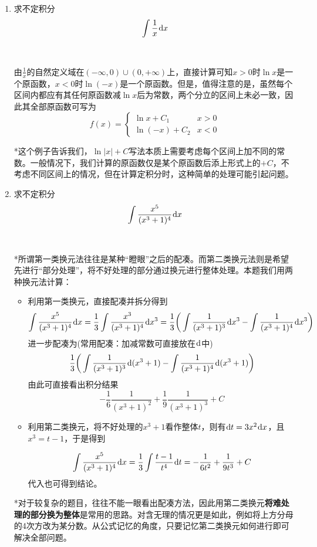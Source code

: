\documentclass[a4paper,UTF8,fontset=windows]{ctexart}
\newcommand*{\dr}{\hspace{0.07em}\mathrm{d}}
\begin{document}
\begin{enumerate}
    \item 求不定积分
    $$\int\frac{1}{x}\dr x$$
    
    \

    由$\frac{1}{x}$的自然定义域在$(-\infty,0)\cup(0,+\infty)$上，直接计算可知$x>0$时$\ln x$是一个原函数，$x<0$时$\ln(-x)$是一个原函数。但是，值得注意的是，虽然每个区间内都应有其任何原函数减$\ln x$后为常数，两个分立的区间上未必一致，因此其全部原函数可写为
    $$f(x)=\begin{cases}\ln x+C_1&x>0\\\ln(-x)+C_2&x<0\end{cases}$$

    *这个例子告诉我们，$\ln|x|+C$写法本质上需要考虑每个区间上加不同的常数。一般情况下，我们计算的原函数仅是某个原函数后添上形式上的$+C$，不考虑不同区间上的情况，但在计算定积分时，这种简单的处理可能引起问题。
    
    \item 求不定积分
    $$\int\frac{x^5}{(x^3+1)^4}\dr x$$

    \
    
    *所谓第一类换元法往往是某种``瞪眼''之后的配凑。而第二类换元法则是希望先进行``部分处理''，将不好处理的部分通过换元进行整体处理。本题我们用两种换元法计算：
    \begin{itemize}
        \item 利用第一类换元，直接配凑并拆分得到
        $$\int\frac{x^5}{(x^3+1)^4}\dr x=\frac{1}{3}\int\frac{x^3}{(x^3+1)^4}\dr x^3=\frac{1}{3}\bigg(\int\frac{1}{(x^3+1)^3}\dr x^3-\int\frac{1}{(x^3+1)^4}\dr x^3\bigg)$$
        进一步配凑为(常用配凑：加减常数可直接放在$\dr$中)
        $$\frac{1}{3}\bigg(\int\frac{1}{(x^3+1)^3}\dr (x^3+1)-\int\frac{1}{(x^3+1)^4}\dr(x^3+1)\bigg)$$
        由此可直接看出积分结果
        $$-\frac{1}{6}\frac{1}{(x^3+1)^2}+\frac{1}{9}\frac{1}{(x^3+1)^3}+C$$

        \item 利用第二类换元，将不好处理的$x^3+1$看作整体$t$，则有$\dr t=3x^2\dr x$，且$x^3=t-1$，于是得到
        
        $$\int\frac{x^5}{(x^3+1)^4}\dr x=\frac{1}{3}\int\frac{t-1}{t^4}\dr t=-\frac{1}{6t^2}+\frac{1}{9t^3}+C$$
        代入也可得到结论。
    \end{itemize}

    *对于较复杂的题目，往往不能一眼看出配凑方法，因此用第二类换元\textbf{将难处理的部分换为整体}是常用的思路。对含无理的情况更是如此，例如将上方分母的4次方改为某分数。从公式记忆的角度，只要记忆第二类换元如何进行即可解决全部问题。


\end{enumerate}
\end{document}
